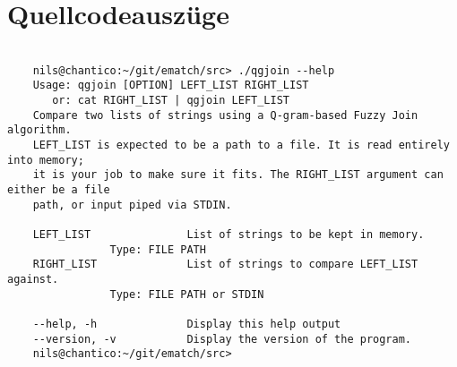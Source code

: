\section{Quellcodeauszüge}





\clearpage




\begin{lstlisting}[style=xterm, caption=Ausgabe der Endnutzerdokumentation über den --help parameter, label=fig:cliHelp,]

	nils@chantico:~/git/ematch/src> ./qgjoin --help
	Usage: qgjoin [OPTION] LEFT_LIST RIGHT_LIST
	   or: cat RIGHT_LIST | qgjoin LEFT_LIST
	Compare two lists of strings using a Q-gram-based Fuzzy Join algorithm.
	LEFT_LIST is expected to be a path to a file. It is read entirely into memory;
	it is your job to make sure it fits. The RIGHT_LIST argument can either be a file
	path, or input piped via STDIN.
	
	LEFT_LIST               List of strings to be kept in memory.
				Type: FILE PATH
	RIGHT_LIST              List of strings to compare LEFT_LIST against.
				Type: FILE PATH or STDIN
	
	--help, -h              Display this help output
	--version, -v           Display the version of the program.
	nils@chantico:~/git/ematch/src>

\end{lstlisting}


